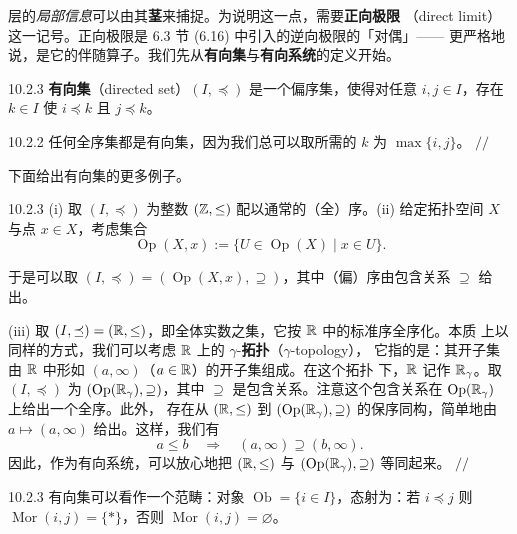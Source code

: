 
层的\emph{局部信息}可以由其\textbf{茎}来捕捉。为说明这一点，需要\textbf{正向极限}
（direct limit）这一记号。正向极限是 6.3 节 (6.16) 中引入的逆向极限的「对偶」——
更严格地说，是它的伴随算子。我们先从\textbf{有向集}与\textbf{有向系统}的定义开始。

\begin{wdefn}{10.2.3}
  \textbf{有向集}（directed set）$(I,\preceq)$ 是一个偏序集，使得对任意
  $i,j\in I$，存在 $k\in I$ 使 $i\preceq k$ 且 $j\preceq k$。
\end{wdefn}

\begin{wexam}{10.2.2}
  任何全序集都是有向集，因为我们总可以取所需的 $k$ 为 $\max\{i,j\}$。
  \hfill$//$
\end{wexam}

下面给出有向集的更多例子。

\begin{wexam}{10.2.3}
  (i) 取 $(I,\preceq)$ 为整数 $(\mathbb{Z},\le)$ 配以通常的（全）序。(ii) 给定拓扑空间
  $X$ 与点 $x\in X$，考虑集合
  \[
    \operatorname{Op}(X,x):=\{U\in\operatorname{Op}(X)\mid x\in U\}.
  \]

  于是可以取 $(I,\preceq)=(\operatorname{Op}(X,x),\supseteq)$，其中（偏）序由包含关系
  $\supseteq$ 给出。

  (iii) 取 $(I,\preceq)=(\mathbb{R},\le)$，即全体实数之集，它按 $\mathbb{R}$ 中的标准序全序化。本质
上以同样的方式，我们可以考虑 $\mathbb{R}$ 上的 $\gamma$-\textbf{拓扑}（$\gamma$-topology），
它指的是：其开子集由 $\mathbb{R}$ 中形如 $(a,\infty)$（$a\in\mathbb{R}$）的开子集组成。在这个拓扑
下，$\mathbb{R}$ 记作 $\mathbb{R}_\gamma$。取 $(I,\preceq)$ 为 $(\operatorname{Op}(\mathbb{R}_\gamma),\supseteq)$，其中
$\supseteq$ 是包含关系。注意这个包含关系在 $\operatorname{Op}(\mathbb{R}_\gamma)$ 上给出一个全序。此外，
存在从 $(\mathbb{R},\le)$ 到 $(\operatorname{Op}(\mathbb{R}_\gamma),\supseteq)$ 的保序同构，简单地由
$a\mapsto(a,\infty)$ 给出。这样，我们有
\[
  a\le b\quad\Longrightarrow\quad(a,\infty)\supseteq(b,\infty).
\]
  因此，作为有向系统，可以放心地把 $(\mathbb{R},\le)$ 与 $(\operatorname{Op}(\mathbb{R}_\gamma),\supseteq)$
  等同起来。
  \hfill$//$
\end{wexam}

\begin{wrem}{10.2.3}
  有向集可以看作一个范畴：对象
  $\operatorname{Ob}=\{i\in I\}$，态射为：若 $i\preceq j$ 则
  $\operatorname{Mor}(i,j)=\{*\}$，否则 $\operatorname{Mor}(i,j)=\varnothing$。
\end{wrem}

